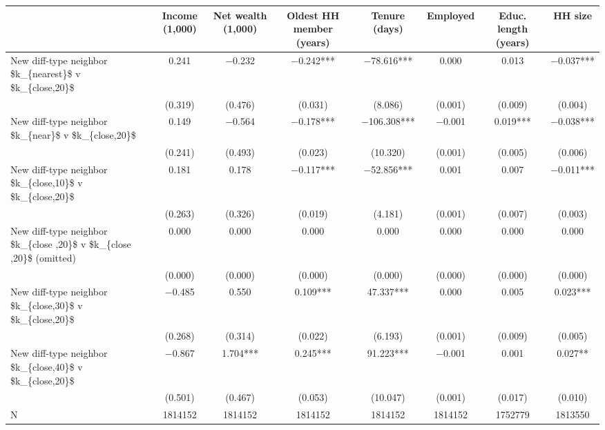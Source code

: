 \begin{tabular}[t]{lccccccc}
\toprule
  & Income (1,000) & Net wealth (1,000) & Oldest HH member (years) & Tenure (days) & Employed & Educ. length (years) & HH size\\
\midrule
New diff-type neighbor \$k\_\{nearest\}\$ v \$k\_\{close,20\}\$ & \num{0.241} & \num{-0.232} & \num{-0.242}*** & \num{-78.616}*** & \num{0.000} & \num{0.013} & \num{-0.037}***\\
 & (\num{0.319}) & (\num{0.476}) & (\num{0.031}) & (\num{8.086}) & (\num{0.001}) & (\num{0.009}) & (\num{0.004})\\
New diff-type neighbor \$k\_\{near\}\$ v \$k\_\{close,20\}\$ & \num{0.149} & \num{-0.564} & \num{-0.178}*** & \num{-106.308}*** & \num{-0.001} & \num{0.019}*** & \num{-0.038}***\\
 & (\num{0.241}) & (\num{0.493}) & (\num{0.023}) & (\num{10.320}) & (\num{0.001}) & (\num{0.005}) & (\num{0.006})\\
New diff-type neighbor \$k\_\{close,10\}\$ v \$k\_\{close,20\}\$ & \num{0.181} & \num{0.178} & \num{-0.117}*** & \num{-52.856}*** & \num{0.001} & \num{0.007} & \num{-0.011}***\\
 & (\num{0.263}) & (\num{0.326}) & (\num{0.019}) & (\num{4.181}) & (\num{0.001}) & (\num{0.007}) & (\num{0.003})\\
New diff-type neighbor \$k\_\{close ,20\}\$ v \$k\_\{close ,20\}\$ (omitted) & \num{0.000} & \num{0.000} & \num{0.000} & \num{0.000} & \num{0.000} & \num{0.000} & \num{0.000}\\
 & (\num{0.000}) & (\num{0.000}) & (\num{0.000}) & (\num{0.000}) & (\num{0.000}) & (\num{0.000}) & (\num{0.000})\\
New diff-type neighbor \$k\_\{close,30\}\$ v \$k\_\{close,20\}\$ & \num{-0.485} & \num{0.550} & \num{0.109}*** & \num{47.337}*** & \num{0.000} & \num{0.005} & \num{0.023}***\\
 & (\num{0.268}) & (\num{0.314}) & (\num{0.022}) & (\num{6.193}) & (\num{0.001}) & (\num{0.009}) & (\num{0.005})\\
New diff-type neighbor \$k\_\{close,40\}\$ v \$k\_\{close,20\}\$ & \num{-0.867} & \num{1.704}*** & \num{0.245}*** & \num{91.223}*** & \num{-0.001} & \num{0.001} & \num{0.027}**\\
 & (\num{0.501}) & (\num{0.467}) & (\num{0.053}) & (\num{10.047}) & (\num{0.001}) & (\num{0.017}) & (\num{0.010})\\
\midrule
N & 1814152 & 1814152 & 1814152 & 1814152 & 1814152 & 1752779 & 1813550\\

\end{tabular}
